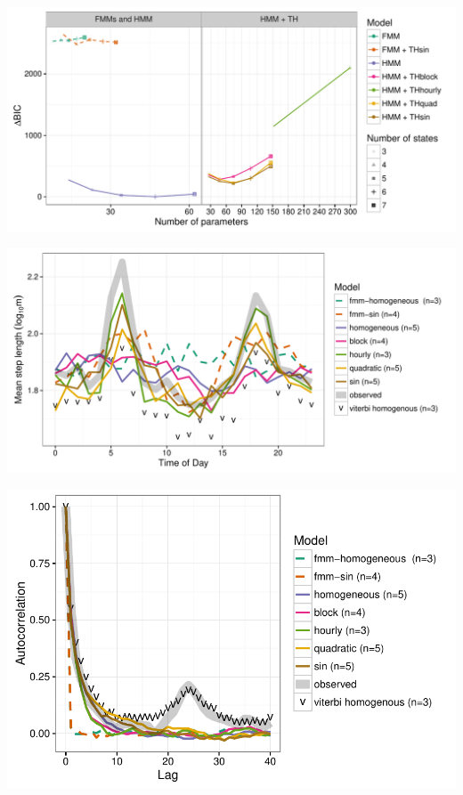 \documentclass{article}\usepackage[]{graphicx}\usepackage{xcolor}
\makeatletter
\def\maxwidth{ %
  \ifdim\Gin@nat@width>\linewidth
    \linewidth
  \else
    \Gin@nat@width
  \fi
}
\newenvironment{knitrout}{}{} %
\makeatother
\begin{document}
\begin{knitrout}
\color{fgcolor}
\includegraphics[width=\maxwidth]{figure/adj_BIC_comparisons15-1} 

\end{knitrout}

\clearpage

\begin{knitrout}
\color{fgcolor}
\includegraphics[width=\maxwidth]{figure/avg_step_length_by_time15-1} 

\end{knitrout}

\clearpage

\begin{knitrout}
\color{fgcolor}
\includegraphics[width=\maxwidth]{figure/acf_plot15-1} 

\end{knitrout}
\end{document}
